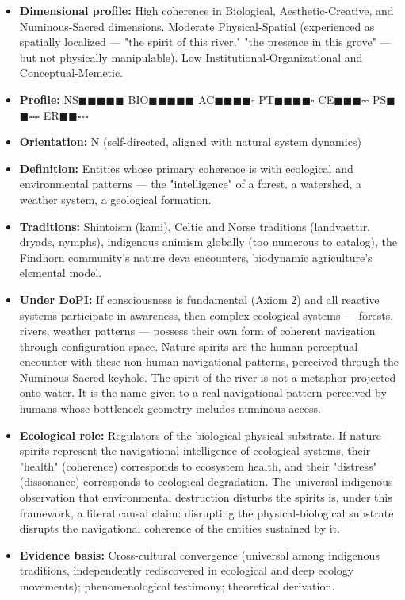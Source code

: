 \begin{itemize}[nosep,leftmargin=*]
  \item \textbf{Dimensional profile:} High coherence in Biological, Aesthetic-Creative, and Numinous-Sacred dimensions. Moderate Physical-Spatial (experienced as spatially localized — "the spirit of this river," "the presence in this grove" — but not physically manipulable). Low Institutional-Organizational and Conceptual-Memetic.
  \item \textbf{Profile:} NS$\blacksquare$$\blacksquare$$\blacksquare$$\blacksquare$$\blacksquare$ BIO$\blacksquare$$\blacksquare$$\blacksquare$$\blacksquare$$\blacksquare$ AC$\blacksquare$$\blacksquare$$\blacksquare$$\blacksquare$$\square$ PT$\blacksquare$$\blacksquare$$\blacksquare$$\blacksquare$$\square$ CE$\blacksquare$$\blacksquare$$\blacksquare$$\square$$\square$ PS$\blacksquare$$\blacksquare$$\square$$\square$$\square$ ER$\blacksquare$$\blacksquare$$\square$$\square$$\square$
  \item \textbf{Orientation:} N (self-directed, aligned with natural system dynamics)
  \item \textbf{Definition:} Entities whose primary coherence is with ecological and environmental patterns — the "intelligence" of a forest, a watershed, a weather system, a geological formation.
  \item \textbf{Traditions:} Shintoism (kami), Celtic and Norse traditions (landvaettir, dryads, nymphs), indigenous animism globally (too numerous to catalog), the Findhorn community's nature deva encounters, biodynamic agriculture's elemental model.
  \item \textbf{Under DoPI:} If consciousness is fundamental (Axiom 2) and all reactive systems participate in awareness, then complex ecological systems — forests, rivers, weather patterns — possess their own form of coherent navigation through configuration space. Nature spirits are the human perceptual encounter with these non-human navigational patterns, perceived through the Numinous-Sacred keyhole. The spirit of the river is not a metaphor projected onto water. It is the name given to a real navigational pattern perceived by humans whose bottleneck geometry includes numinous access.
  \item \textbf{Ecological role:} Regulators of the biological-physical substrate. If nature spirits represent the navigational intelligence of ecological systems, their "health" (coherence) corresponds to ecosystem health, and their "distress" (dissonance) corresponds to ecological degradation. The universal indigenous observation that environmental destruction disturbs the spirits is, under this framework, a literal causal claim: disrupting the physical-biological substrate disrupts the navigational coherence of the entities sustained by it.
  \item \textbf{Evidence basis:} Cross-cultural convergence (universal among indigenous traditions, independently rediscovered in ecological and deep ecology movements); phenomenological testimony; theoretical derivation.
\end{itemize}


